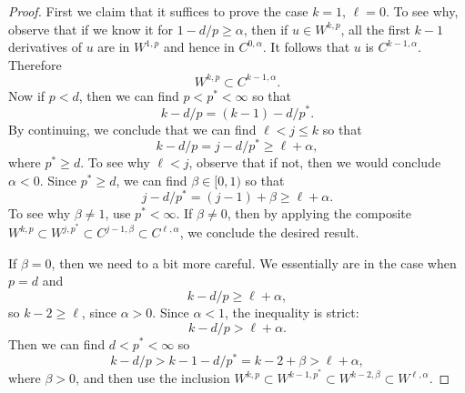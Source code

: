 \begin{proof}
  First we claim that it suffices to prove the case $k=1$, $\ell=0$. To see why, observe that if we know it for $1-d/p\ge \alpha$, then if $u\in W^{k,p}$, all the first $k-1$ derivatives of $u$ are in $W^{1,p}$ and hence in $C^{0,\alpha}$. It follows that $u$ is $C^{k-1,\alpha}$. Therefore
  \begin{equation*}
    W^{k,p}\subset C^{k-1,\alpha}.
  \end{equation*}
  Now if $p<d$, then we can find $p<p^{*}<\infty$ so that
  \begin{equation*}
    k-d/p=(k-1)-d/p^{*}.
  \end{equation*}
  By continuing, we conclude that we can find $\ell <j\le k$ so that
  \begin{equation*}
    k-d/p=j-d/p^{*}\ge \ell+\alpha,
  \end{equation*}
  where $p^{*}\ge d$. To see why $\ell<j$, observe that if not, then we would conclude $\alpha<0$. Since $p^{*}\ge d$, we can find $\beta\in [0,1)$ so that
  \begin{equation*}
    j-d/p^{*}=(j-1)+\beta\ge \ell+\alpha.
  \end{equation*}
  To see why $\beta\ne 1$, use $p^{*}<\infty$. If $\beta\ne 0$, then by applying the composite $W^{k,p}\subset W^{j,p^{*}}\subset C^{j-1,\beta}\subset C^{\ell,\alpha}$, we conclude the desired result.

  If $\beta=0$, then we need to a bit more careful. We essentially are in the case when $p=d$ and
  \begin{equation*}
   k-d/p\ge \ell+\alpha, 
 \end{equation*}
 so $k-2\ge \ell$, since $\alpha>0$. Since $\alpha<1$, the inequality is strict:
 \begin{equation*}
   k-d/p>\ell+\alpha.
 \end{equation*}
 Then we can find $d<p^{*}<\infty$ so
 \begin{equation*}
   k-d/p>k-1-d/p^{*}=k-2+\beta>\ell+\alpha,
 \end{equation*}
 where $\beta>0$, and then use the inclusion $W^{k,p}\subset W^{k-1,p^{*}}\subset W^{k-2,\beta}\subset W^{\ell,\alpha}$.
 

\end{proof}
